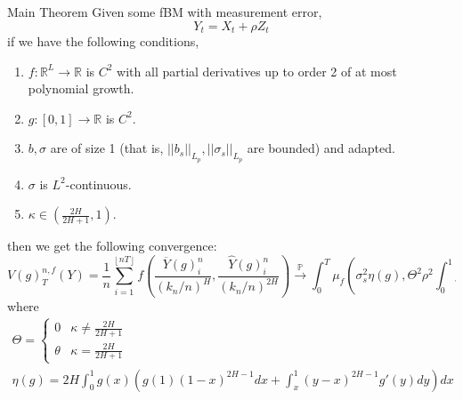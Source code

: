 \documentclass[final,hyperref={pdfpagelabels=false}]{beamer}
\newcommand{\R}{\mathbb{R}}
\begin{document}
\begin{frame}{}
\begin{columns}[t]
      \begin{column}{0.4\linewidth}
        \begin{block}{Main Theorem}
          Given some fBM with measurement error,
          \begin{equation*}
            Y_t = X_t + \rho Z_t
          \end{equation*}
          if we have the following conditions,
          \begin{enumerate}
            \item \(f: \R^L \rightarrow \R\) is \(C^2\) with all partial derivatives up to order 2 of at most polynomial growth.
            \item \(g: [0,1] \rightarrow \R\) is \(C^2\).
            \item \(b, \sigma\) are of size 1 (that is, \(||b_s||_{L_p}, ||\sigma_s||_{L_p}\) are bounded) and adapted.
            \item \(\sigma\) is \(L^2\)-continuous.
            \item \(\kappa \in \left(\frac{2H}{2H+1}, 1\right)\).
          \end{enumerate}
          then we get the following convergence:
          \begin{equation*}
            V(g)^{n,f}_T(Y) = \frac{1}{n}\sum_{i=1}^{\left\lfloor nT \right\rfloor}f\left( \frac{\overline{Y}(g)^n_i}{\left( k_n/n \right)^H}, \frac{\widehat{Y}(g)^n_i}{\left( k_n/n \right)^{2H}} \right) \overset{\mathbb{P}}{\rightarrow} \int_0^T \mu_f\left( \sigma_s^2\eta\left( g \right), \Theta^2\rho^2 \int_0^1g'(r)^2dr \right)ds
          \end{equation*}
          where
          \begin{gather*}
            \Theta =
            \begin{cases}
              0 & \kappa \neq \frac{2H}{2H+1} \\
              \theta &  \kappa = \frac{2H}{2H+1}
            \end{cases} \\
            \eta(g) = 2H\int_0^1g(x)\left(g(1)(1-x)^{2H-1}dx + \int_x^1(y-x)^{2H-1}g'(y)dy\right)dx
          \end{gather*}
        \end{block}


\end{column}
\end{columns}
\end{frame}
\end{document}
